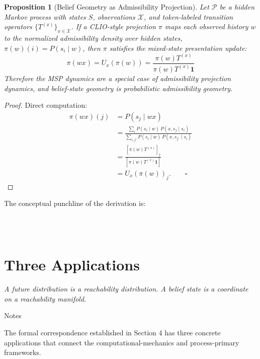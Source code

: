 \documentclass[12pt, a4paper]{article}
\theoremstyle{plain}
\newtheorem{proposition}[theorem]{Proposition}
\theoremstyle{definition}
\theoremstyle{remark}
\begin{document}
\begin{proposition}[Belief Geometry as Admissibility Projection]
\label{prop:belief-admiss-derive}
Let $\mathcal{P}$ be a hidden Markov process with states $S$, observations
$\mathcal{X}$, and token-labeled transition operators $\{T^{(x)}\}_{x \in
\mathcal{X}}$. If a CLIO-style projection $\pi$ maps each observed history $w$
to the normalized admissibility density over hidden states,
$\pi(w)(i) = P(s_i \mid w)$, then $\pi$ satisfies the mixed-state presentation
update:
$$\pi(wx) = U_x(\pi(w)) = \frac{\pi(w) T^{(x)}}{\pi(w) T^{(x)} \mathbf{1}}$$
Therefore the MSP dynamics are a special case of admissibility projection
dynamics, and belief-state geometry is probabilistic admissibility geometry.
\end{proposition}

\begin{proof}
Direct computation:
\begin{align*}
\pi(wx)(j) &= P(s_j \mid wx) \\
&= \frac{\sum_i P(s_i \mid w)\, P(x, s_j \mid s_i)}
{\sum_{i,j'} P(s_i \mid w)\, P(x, s_{j'} \mid s_i)} \\
&= \frac{[\pi(w) T^{(x)}]_j}{[\pi(w) T^{(x)} \mathbf{1}]} \\
&= U_x(\pi(w))_j. \qquad \square
\end{align*}
\end{proof}

The conceptual punchline of the derivation is:

\begin{center}
\\[0.5em]
\\[0.5em]
\end{center}

\section{Three Applications}

\epigraph{\textit{A future distribution is a reachability distribution.
A belief state is a coordinate on a reachability manifold.}}{Notes}

\noindent
The formal correspondence established in Section 4 has three concrete
applications that connect the computational-mechanics and process-primary
frameworks.
\end{document}
